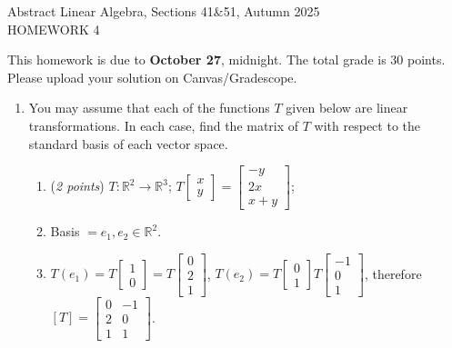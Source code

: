 \documentclass[11pt]{article}
\newcommand{\bbR}{\mathbb{R}}
\newcommand{\head}[1]{
	\begin{center}
		{\large #1}
		\vspace{.2 in}
	\end{center}
	
	\bigskip 
}
\theoremstyle{definition}
\numberwithin{equation}{subsection}
\begin{document}
\pagestyle{plain}


\setcounter{section}{1}   

\head{Abstract Linear Algebra, Sections 41\&51, Autumn 2025\\ HOMEWORK 4} 

This homework is due to {\bf October 27}, midnight. The total grade is 30 points. Please upload your solution on Canvas/Gradescope.

\begin{enumerate}

\item You may assume that each of the functions $T$ given below are linear transformations. In each case, find the matrix of $T$ with respect to the standard basis of each vector space. 

\begin{enumerate}

\item (\emph{2 points}) $T\colon\mathbb{R}^2\to\mathbb{R}^3$; \hspace{1in} $T\begin{bmatrix} x\\ y\end{bmatrix}=\begin{bmatrix} -y\\ 2x\\ x+y\end{bmatrix}$;
\item[] Basis $=e_1,e_2 \in \bbR^2$. 
\item[] $T(e_1)=T\begin{bmatrix} 1 \\ 0 \end{bmatrix}=T\begin{bmatrix} 0\\2\\1\end{bmatrix}$, $T(e_2)=T\begin{bmatrix}0\\1\end{bmatrix}T\begin{bmatrix}-1\\0\\1\end{bmatrix}$, therefore $[T]=\begin{bmatrix}
    0&-1\\ 2&0\\1&1
\end{bmatrix}$.


\end{enumerate}
\end{enumerate}
\end{document}

